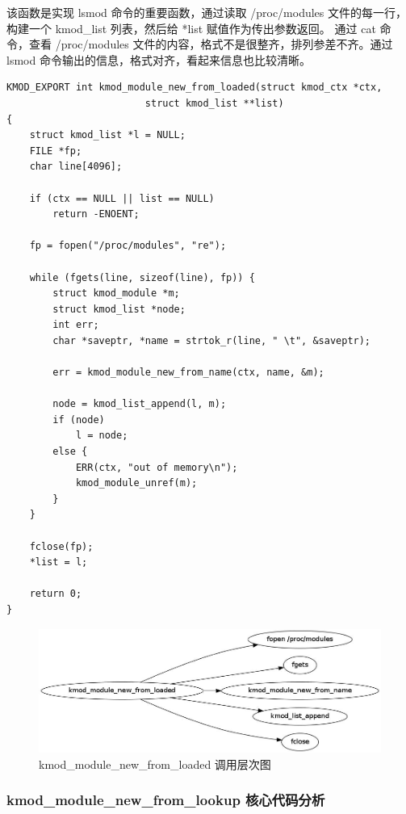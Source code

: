 \documentclass[11pt,a4paper]{article}
\makeatletter
\def\maxwidth{\ifdim\Gin@nat@width>\linewidth\linewidth
\else\Gin@nat@width\fi}
\let\Oldincludegraphics\includegraphics
\renewcommand{\includegraphics}[1]{\Oldincludegraphics[width=\maxwidth]{#1}}
\makeatother
\begin{document}
该函数是实现 lsmod 命令的重要函数，通过读取 /proc/modules
文件的每一行，构建一个 kmod\_list 列表，然后给 *list
赋值作为传出参数返回。 通过 cat 命令，查看 /proc/modules
文件的内容，格式不是很整齐，排列参差不齐。通过 lsmod
命令输出的信息，格式对齐，看起来信息也比较清晰。

{\begin{shaded}\begin{verbatim}
KMOD_EXPORT int kmod_module_new_from_loaded(struct kmod_ctx *ctx,
                        struct kmod_list **list)
{
    struct kmod_list *l = NULL;
    FILE *fp;
    char line[4096];

    if (ctx == NULL || list == NULL)
        return -ENOENT;

    fp = fopen("/proc/modules", "re");

    while (fgets(line, sizeof(line), fp)) {
        struct kmod_module *m;
        struct kmod_list *node;
        int err;
        char *saveptr, *name = strtok_r(line, " \t", &saveptr);

        err = kmod_module_new_from_name(ctx, name, &m);

        node = kmod_list_append(l, m);
        if (node)
            l = node;
        else {
            ERR(ctx, "out of memory\n");
            kmod_module_unref(m);
        }
    }

    fclose(fp);
    *list = l;

    return 0;
}
\end{verbatim}\end{shaded}}
\begin{figure}[htbp]
\centering
\includegraphics{./figures/kmod_module_new_from_loaded.jpg}
\caption{kmod\_module\_new\_from\_loaded 调用层次图}
\end{figure}

\subsubsection{kmod\_module\_new\_from\_lookup 核心代码分析}
\end{document}
